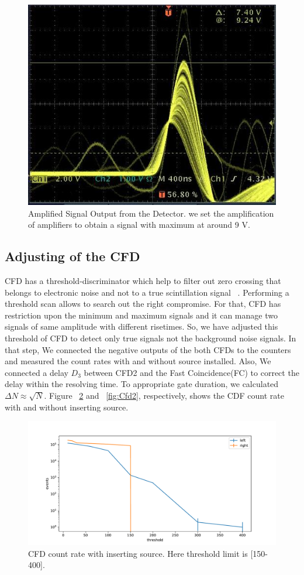 \begin{figure}[ht]
	\centering
	\includegraphics[width=0.8\linewidth]{./figs/Amplifier.jpg}
	\caption{Amplified Signal Output from the Detector. we set the amplification of amplifiers to obtain a signal with maximum at around 9 V.}%
	\label{fig:Amplified}
\end{figure}
\newpage
\subsection{Adjusting of the CFD}
CFD has a threshold-discriminator which help to filter out zero crossing that belongs to electronic noise and not to a true scintillation signal ~\cite{descer}. Performing a threshold scan allows to search out the right compromise. For that, CFD has restriction upon the minimum and maximum signals and it can manage two signals of same amplitude with different risetimes.  So, we have adjusted this threshold of CFD to detect only true signals not the background noise signals. In that step, We connected the negative outputs of the both CFDs to the counters and measured the count rates with and without source installed. Also, We connected a delay $ D_{3} $ between CFD2 and the Fast Coincidence(FC) to correct the delay within the resolving time. To appropriate gate duration, we calculated $\Delta N \approx \sqrt{N}$. Figure ~\ref{fig:Cfd1} and ~\ref{fig:Cfd2}, respectively, shows the CDF count rate with and without inserting source.

\begin{figure}[ht]
	\centering
	\includegraphics[width=0.8\linewidth]{./figs/cfd.pdf}
	\caption{CFD count rate with inserting source. Here threshold limit is [150-400]. }%
	\label{fig:Cfd1}
\end{figure}

